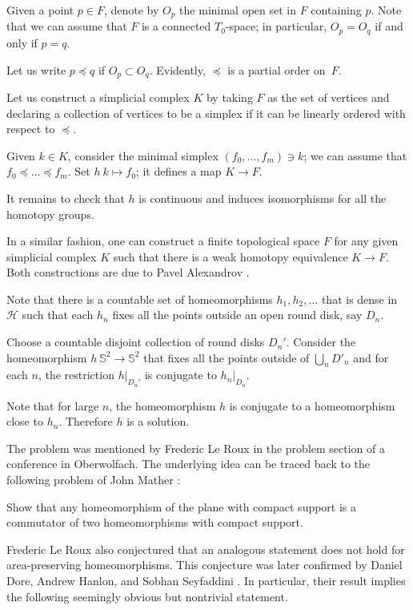 Given a point $p\in F$,
denote by $O_p$ the minimal open set in $F$ containing $p$. 
Note that we can assume that $F$ is a connected $T_0$-space;
in particular, $O_p=O_q$ if and only if $p=q$.

Let us write $p\preccurlyeq q$ 
if $O_p\subset O_q$.
Evidently, $\preccurlyeq$ is a partial order on~$F$.

Let us construct a simplicial complex $K$ 
by taking $F$ as the set of vertices
and declaring a collection of vertices to be a simplex 
if it can be linearly ordered with respect to $\preccurlyeq$.

Given $k\in K$,
consider the minimal simplex $(f_0,\dots,f_m)\ni k$;
we can assume that $f_0\preccurlyeq \dots\preccurlyeq f_m$.
Set $h\:k\mapsto f_0$;
it defines a map $K\to F$.

It remains to check that $h$ is continuous 
and induces isomorphisms for all the homotopy groups.
\qeds

In a similar fashion, one can construct a finite topological space $F$ for any given simplicial complex $K$ 
such that 
there is a weak homotopy equivalence $K\to F$.
Both constructions are due to Pavel Alexandrov
\cite{alexandrov-finite,mccord}.

Note that there is a countable set of homeomorphisms $h_1,h_2,\dots$ that is dense in $\mathcal{H}$
such that
each $h_n$ fixes all the points outside an open round disk, say $D_n$.

Choose a countable disjoint collection of round disks $D_n'$.
Consider the homeomorphism $h\:\mathbb S^2\to \mathbb S^2$
that fixes all the points outside of $\bigcup_nD'_n$ and
for each $n$,
the restriction $h|_{D_n'}$ is conjugate to $h_n|_{D_n}$. 


Note that for large $n$, the homeomorphism $h$ is conjugate to a homeomorphism close to $h_n$.
Therefore $h$ is a solution.
\qeds

The problem was mentioned by Frederic Le Roux \cite{rox} in the problem section of a conference in Oberwolfach.
The underlying idea can be traced back to the following problem of John Mather \cite{mather}:

\begin{pr}
Show that any homeomorphism of the plane with compact support is a commutator of two homeomorphisms with compact support.
\end{pr}

Frederic Le Roux also conjectured that an analogous statement does not hold for area-preserving homeomorphisms.
This conjecture was later confirmed by Daniel Dore, Andrew Hanlon, and Sobhan Seyfaddini \cite{dore-hanlon,seyfaddini}.
In particular, their result implies the following seemingly obvious but nontrivial statement.


